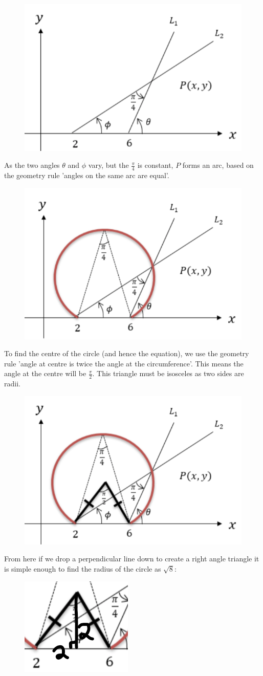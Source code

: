 \documentclass[../main.tex]{subfiles}
\begin{document}
\begin{enumerate}[itemsep=1cm]
    \begin{figure}[h]
        \centering
        \includegraphics[width=0.25\linewidth]{images/t2w8q3a2.png}
    \end{figure}

    As the two angles $\theta$ and $\phi$ vary, but the $\frac{\pi}{4}$ is constant, $P$ forms an arc, based on the geometry rule 'angles on the same arc are equal'.

    \begin{figure}[h]
        \centering
        \includegraphics[width=0.25\linewidth]{images/t2w8q3a3.png}
    \end{figure}

    To find the centre of the circle (and hence the equation), we use the geometry rule 'angle at centre is twice the angle at the circumference'. This means the angle at the centre will be $\frac{\pi}{2}$. This triangle must be isosceles as two sides are radii.

    \begin{figure}[H]
        \centering
        \includegraphics[width=0.25\linewidth]{images/t2w8q3a4.png}
    \end{figure}

    From here if we drop a perpendicular line down to create a right angle triangle it is simple enough to find the radius of the circle as $\sqrt{8}$:

    \begin{figure}[h]
        \centering
        \includegraphics[width=0.15\linewidth]{images/t2w8q3a5.png}
    \end{figure}


\end{enumerate}
\end{document}
